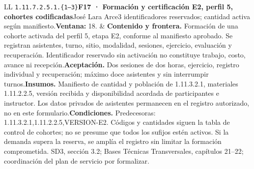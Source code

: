 \begin{longtable}{L{\tabcolsep\relax}L{\tabcolsep\relax}}
\texttt{1.\allowbreak{}11.\allowbreak{}7.\allowbreak{}2.\allowbreak{}5.\allowbreak{}1.\allowbreak{}\{1--3\}}\newline{}\textbf{F17 · Formación y certificación E2, perfil 5, cohortes codificadas}\newline{}José Lara Arce\newline{}3 identificadores reservados; cantidad activa según manifiesto.\newline{}\textbf{Ventana:} 18. & \textbf{Contenido y frontera.} Formación de una cohorte activada del perfil 5, etapa E2, conforme al manifiesto aprobado. Se registran asistentes, turno, sitio, modalidad, sesiones, ejercicio, evaluación y recuperación. Identificador reservado sin activación no constituye trabajo, costo, avance ni recepción.\newline{}\textbf{Aceptación.} Dos sesiones de dos horas, ejercicio, registro individual y recuperación; máximo doce asistentes y sin interrumpir turnos.\newline{}\textbf{Insumos.} Manifiesto de cantidad y población de 1.11.3.2.1, materiales 1.11.2.2.5, versión recibida y disponibilidad acordada de participantes e instructor. Los datos privados de asistentes permanecen en el registro autorizado, no en este formulario.\newline{}\textbf{Condiciones.} Predecesoras: 1.11.3.2.1,1.11.2.2.5,VERSION-E2. Códigos y cantidades siguen la tabla de control de cohortes; no se presume que todos los sufijos estén activos. Si la demanda supera la reserva, se amplía el registro sin limitar la formación comprometida. SD3, sección 3.2; Bases Técnicas Transversales, capítulos 21--22; coordinación del plan de servicio por formalizar.\\\hline

\end{longtable}
